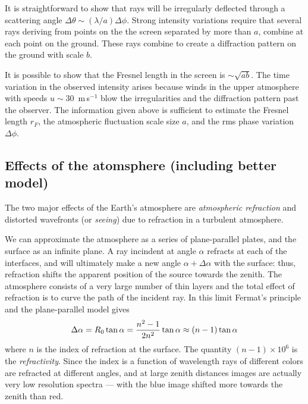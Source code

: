 It is straightforward to show that rays will be irregularly deflected through
a scattering angle $\Delta\theta\sim({\lambda/a})\Delta\phi$. Strong 
intensity variations require that several rays deriving from points on the 
the screen separated by more than $a$, combine at each point on the ground.
These rays combine to create a diffraction pattern on the ground with
scale $b$. 

It is possible to show that the Fresnel length in the screen is 
$\sim\sqrt{ab}$. The time variation in the observed intensity arises because 
winds in the upper atmosphere with speeds $u\sim 30$~m$\,$s$^{-1}$ blow 
the irregularities and the diffraction pattern past the observer. The 
information given above is sufficient to estimate the Fresnel length $r_{F}$, 
the atmospheric fluctuation scale size $a$, and the rms phase variation 
$\Delta\phi$.

\subsection{Effects of the atomsphere (including better model)}

The two major effects of the Earth's atmosphere are {\it atmospheric
  refraction} and distorted wavefronts (or {\it seeing}) due to
refraction in a turbulent atmosphere.

We can approximate the atmosphere as a series of plane-parallel
plates, and the surface as an infinite plane. A ray incindent at angle
$\alpha$ refracts at each of the interfaces, and will ultimately make
a new angle $\alpha+\Delta\alpha$ with the surface: thus, refraction
shifts the apparent position of the source towards the zenith. The
atmosphere consists of a very large number of thin layers and the
total effect of refraction is to curve the path of the incident
ray. In this limit Fermat's principle and the plane-parallel model
gives 
\[
\Delta\alpha=R_0\tan{\alpha}={n^2-1\over 2n^2}\tan{\alpha}\approx
(n-1)\tan{\alpha}
\]
where $n$ is the index of refraction at the surface. The quantity
$(n-1)\times 10^6$ is the {\it refractivity}. Since the index is a
function of wavelength rays of different colors are refracted at
different angles, and at large zenith distances images are actually
very low resolution spectra --- with the blue image shifted more
towards the zenith than red.

